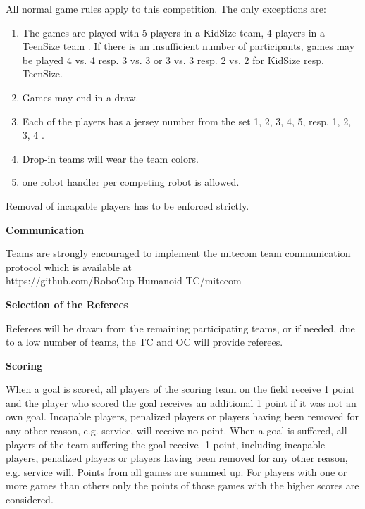 All normal game rules apply to this competition. The only exceptions are:
\begin{enumerate}
\item The games are played with 5 players in a KidSize team, 4 players in a TeenSize team . If there is an insufficient number of participants, games may be played 4 vs. 4 resp. 3 vs. 3 or 3 vs. 3 resp. 2 vs. 2 for KidSize resp. TeenSize.
\item Games may end in a draw.
\item Each of the players has a jersey number from the set {1, 2, 3, 4, 5}, resp. {1, 2, 3, 4} .
\item Drop-in teams will wear the   team colors.
\item {} one robot handler per competing robot is allowed. 
\end{enumerate}

Removal of incapable players has to be enforced strictly.

\bigskip
 
{\bfseries Communication}

Teams are strongly encouraged to implement the mitecom team communication protocol which is available at \\
\textcolor[rgb]{0.0,0.0,0.49803922}{https://github.com/RoboCup-Humanoid-TC/mitecom}

\bigskip
 
{\bfseries Selection of the Referees}

Referees will be drawn from the remaining participating teams, or if needed, due to a low number of teams, the TC and OC will provide referees.

\bigskip
 
{\bfseries Scoring}

When a goal is scored, all players of the scoring team on the field receive 1 point and the player who scored the goal receives an additional 1 point if it was not an own goal.  Incapable players, penalized players or players having been removed for any other reason, e.g. service, will receive no point. When a goal is suffered, all players of the team suffering the goal receive -1 point, including incapable players, penalized players or players having been removed for any other reason, e.g. service will. Points from all games are summed up. For players with one or more games than others only the points of those games with the higher scores are considered.

